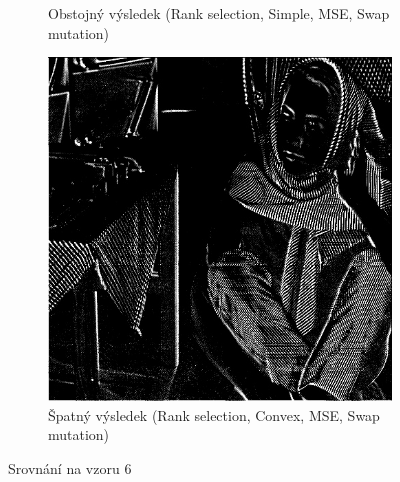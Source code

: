 \documentclass[a4paper,11pt,titlepage]{scrartcl}
\begin{document}
\begin{figure}[!h]
\begin{subfigure}[b]{0.32\textwidth}
        \caption{Obstojný výsledek (Rank selection, Simple, MSE, Swap mutation)}
        \label{fig:ex62}
    \end{subfigure}
    \begin{subfigure}[b]{0.32\textwidth}
        \includegraphics[width=\textwidth]{img/ranksel-convex-mse-swap_example6.jpg}
        \caption{Špatný výsledek (Rank selection, Convex, MSE, Swap mutation)}
        \label{fig:ex63}
    \end{subfigure}
    \caption{Srovnání na vzoru 6}
    \label{porovnani_ex6}
\end{figure}
\end{document}
